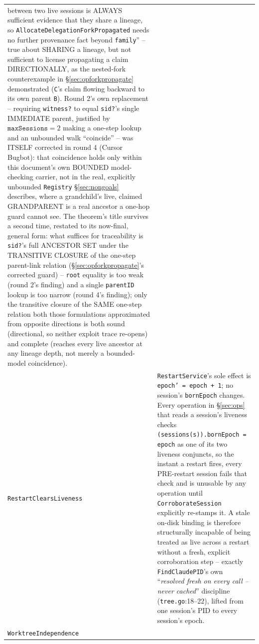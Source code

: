 \documentclass[a4paper,10pt,fleqn]{article}
\newcommand{\fpath}[1]{\texttt{#1}}
\newcommand{\field}[1]{\texttt{#1}}
\begin{document}
\begin{center}
\begin{tabularx}{\textwidth}{@{}lX@{}}
  between two live sessions is ALWAYS sufficient evidence that they
  share a lineage, so \field{AllocateDelegationForkPropagated} needs no
  further provenance fact beyond \field{family}'' -- true about SHARING
  a lineage, but not sufficient to license propagating a claim
  DIRECTIONALLY, as the nested-fork counterexample in
  \S\ref{sec:opforkpropagate} demonstrated (\field{C}'s claim flowing
  backward to its own parent \field{B}). Round 2's own replacement --
  requiring \field{witness?} to equal \field{sid?}'s single IMMEDIATE
  parent, justified by $\field{maxSessions} = 2$ making a one-step
  lookup and an unbounded walk ``coincide'' -- was ITSELF corrected in
  round 4 (Cursor Bugbot): that coincidence holds only within this
  document's own BOUNDED model-checking carrier, not in the real,
  explicitly unbounded \field{Registry} \S\ref{sec:nongoals} describes,
  where a grandchild's live, claimed GRANDPARENT is a real ancestor a
  one-hop guard cannot see. The theorem's title survives a second time,
  restated to its now-final, general form: what suffices for
  traceability is \field{sid?}'s full ANCESTOR SET under the
  TRANSITIVE CLOSURE of the one-step parent-link relation
  (\S\ref{sec:opforkpropagate}'s corrected guard) -- \field{root}
  equality is too weak (round 2's finding) and a single \field{parentID}
  lookup is too narrow (round 4's finding); only the transitive closure
  of the SAME one-step relation both those formulations approximated
  from opposite directions is both sound (directional, so neither
  exploit trace re-opens) and complete (reaches every live ancestor at
  any lineage depth, not merely a bounded-model coincidence). \\
\field{RestartClearsLiveness} &
  \field{RestartService}'s sole effect is \field{epoch' = epoch + 1}; no
  session's \field{bornEpoch} changes. Every operation in
  \S\ref{sec:ops} that reads a session's liveness checks
  \field{(sessions(s)).bornEpoch = epoch} as one of its two liveness
  conjuncts, so the instant a restart fires, every PRE-restart session
  fails that check and is unusable by any operation until
  \field{CorroborateSession} explicitly re-stamps it. A stale on-disk
  binding is therefore structurally incapable of being treated as live
  across a restart without a fresh, explicit corroboration step --
  exactly \field{FindClaudePID}'s own ``\emph{resolved fresh on every
  call -- never cached}'' discipline (\fpath{tree.go}:18--22), lifted
  from one session's PID to every session's epoch. \\
\field{WorktreeIndependence} &

\end{tabularx}
\end{center}
\end{document}
